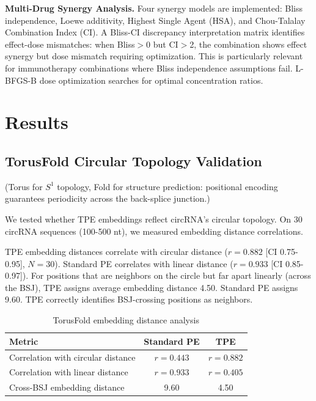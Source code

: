 \documentclass[11pt,a4paper]{article}
\begin{document}
\textbf{Multi-Drug Synergy Analysis.} Four synergy models are implemented: Bliss independence, Loewe additivity, Highest Single Agent (HSA), and Chou-Talalay Combination Index (CI). A Bliss-CI discrepancy interpretation matrix identifies effect-dose mismatches: when Bliss$>$0 but CI$>$2, the combination shows effect synergy but dose mismatch requiring optimization. This is particularly relevant for immunotherapy combinations where Bliss independence assumptions fail. L-BFGS-B dose optimization searches for optimal concentration ratios.

\section{Results}

\subsection{TorusFold Circular Topology Validation}

(Torus for $S^1$ topology, Fold for structure prediction: positional encoding guarantees periodicity across the back-splice junction.)

We tested whether TPE embeddings reflect circRNA's circular topology. On 30 circRNA sequences (100-500 nt), we measured embedding distance correlations.

TPE embedding distances correlate with circular distance ($r=0.882$ [CI 0.75-0.95], $N=30$). Standard PE correlates with linear distance ($r=0.933$ [CI 0.85-0.97]). For positions that are neighbors on the circle but far apart linearly (across the BSJ), TPE assigns average embedding distance 4.50. Standard PE assigns 9.60. TPE correctly identifies BSJ-crossing positions as neighbors.

\begin{table}[H]
\centering
\caption{TorusFold embedding distance analysis}
\label{tab:torusfold_validation}
\begin{tabular}{lcc}
\toprule
\textbf{Metric} & \textbf{Standard PE} & \textbf{TPE} \\
\midrule
Correlation with circular distance & $r=0.443$ & $r=0.882$ \\
Correlation with linear distance & $r=0.933$ & $r=0.405$ \\
Cross-BSJ embedding distance & 9.60 & 4.50 \\
\bottomrule
\end{tabular}
\end{table}
\end{document}
